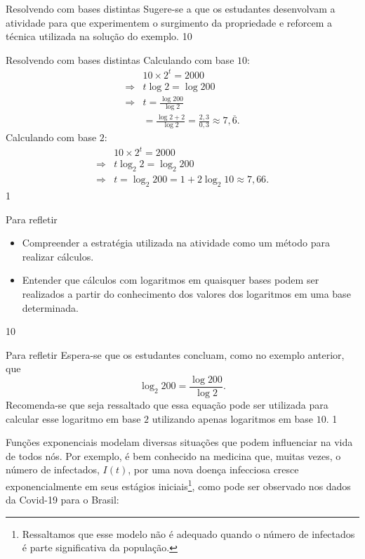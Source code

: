 \clearmargin
\begin{sugestions}{Resolvendo com bases distintas}
{
	Sugere-se a que os estudantes desenvolvam a atividade para que experimentem o surgimento da propriedade e reforcem a técnica utilizada na solução do exemplo.
}{1}{0}
\end{sugestions}
\begin{answer}{Resolvendo com bases distintas}
{
	Calculando com base $10$:
	\begin{align*} &10 \times 2^t = 2000\\
	\Rightarrow& t\log 2 = \log 200\\
	\Rightarrow& t = \frac{\log 200}{\log 2}\\
	& = \frac{\log 2 + 2}{\log 2}= \frac{2{,}3}{0{,}3} \approx 7{,}\overline{6}.
	\end{align*}
	Calculando com base $2$:
	\begin{align*} &10 \times 2^t = 2000\\
	\Rightarrow& t\log_{2} 2 = \log_{2} 200\\
	\Rightarrow& t = \log_{2} 200  = 1+2\log_2 10 \approx 7{,}66.
	\end{align*}
}{1}
\end{answer}
\begin{objectives}{Para refletir}
{
	\begin{itemize}
	\item Compreender a estratégia utilizada na atividade como um método para realizar cálculos.
	\item Entender que cálculos com logaritmos em quaisquer bases podem ser realizados a partir do conhecimento dos valores dos logaritmos em uma base determinada.
	\end{itemize}
}{1}{0}
\end{objectives}
\begin{answer}{Para refletir}
{
	Espera-se que os estudantes concluam, como no exemplo anterior, que 
	\begin{equation*}
	\log_2 200 = \dfrac{\log 200}{\log 2}.
 	\end{equation*}
	Recomenda-se que seja ressaltado que essa equação pode ser utilizada para calcular esse logaritmo em base $2$ utilizando apenas logaritmos em base $10$.
}{1}
\end{answer}


Funções exponenciais modelam diversas situações que podem influenciar na vida de todos nós. Por exemplo, é bem conhecido na medicina que, muitas vezes, o número de infectados, $I(t)$, por uma nova doença infecciosa cresce exponencialmente em seus estágios iniciais\footnote{Ressaltamos que esse modelo não é adequado quando o número de infectados é parte significativa da população.}, como pode ser observado nos dados da Covid-19 para o Brasil:

